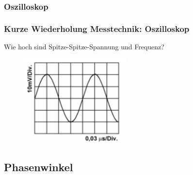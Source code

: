 \subsubsection[Oszilloskop]{Oszilloskop}

\begin{frame}
  \frametitle{Kurze Wiederholung Messtechnik: Oszilloskop}


  \begin{block}{
    Wie hoch sind Spitze-Spitze-Spannung und Frequenz?
    \begin{center}
      \begin{figure}
        \includegraphics[width=0.5\textwidth,height=.4\textheight,keepaspectratio]{a11/TB605.png}
      \end{figure}
    \end{center}
    }
  \end{block}

\end{frame}

\subsection{Phasenwinkel}

